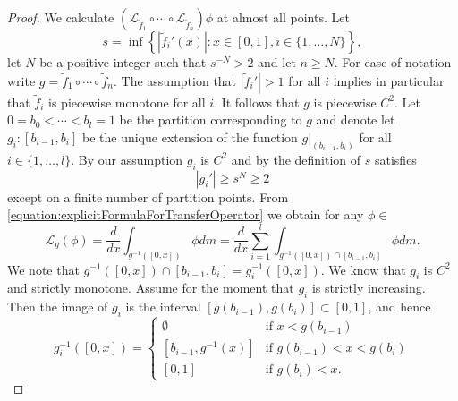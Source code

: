 \documentclass[pdftex,11pt,a4paper,oneside]{article}
\theoremstyle{plain}
\newcommand{\rstr}[2]{\left. #1 \right\rvert_{#2}}
\begin{document}
\begin{proof}
We calculate $\left(\mathcal{L}_{\tilde{f}_1}\circ\cdots\circ\mathcal{L}_{\tilde{f}_n}\right)\phi$ at almost all points. Let \[s = \inf \left\{|\tilde{f}_i'(x)|: x\in [0,1], i\in\{1,\ldots,N\} \right\},\] let $N$ be a positive integer such that $s^{-N}>2$ and let $n\geq N$. For ease of notation write $g = \tilde{f}_1\circ\cdots\circ \tilde{f}_n$. The assumption that $|\tilde{f}_i'|>1$ for all $i$ implies in particular that $\tilde{f}_i$ is piecewise monotone for all $i$. It follows that $g$ is piecewise $C^2$. Let $0 = b_0<\cdots <b_l=1$ be the partition corresponding to $g$ and denote let $g_i:[b_{i-1},b_i]$ be the unique extension of the function $ \rstr{g}{(b_{i-1},b_i)}$
for all $i\in\{1,\ldots,l\}$. By our assumption $g_i$ is $C^2$ and by the definition of $s$ satisfies 
\begin{equation}\label{equation:strongExpansion}
    |g_i'|\geq s^N\geq 2
\end{equation}
except on a finite number of partition points. From \eqref{equation:explicitFormulaForTransferOperator} we obtain for any $\phi \in $
\begin{equation}\label{equation:derivingIntPhi}
    \mathcal{L}_g(\phi) = \frac{d}{d x}\int_{g^{-1}([0,x])} \phi dm =\frac{d}{d x}\sum_{i=1}^l\int_{g^{-1}([0,x])\cap [b_{i-1},b_i]} \phi dm.
\end{equation}
We note that $g^{-1}([0,x])\cap [b_{i-1},b_i] = g_i^{-1}([0,x])$. We know that $g_i$ is $C^2$ and strictly monotone. Assume for the moment that $g_i$ is strictly increasing. Then the image of $g_i$ is the interval $[g(b_{i-1}),g(b_i)]\subset [0,1]$, and hence 
\[g_i^{-1}([0,x]) = \begin{cases}
                    \emptyset & \text{if } x<g(b_{i-1})\\
                    [b_{i-1},g^{-1}(x)] & \text{if } g(b_{i-1})<x<g(b_i)\\
                    [0,1] &\text{if } g(b_i)<x.
                    

\end{cases}\]
\end{proof}
\end{document}
